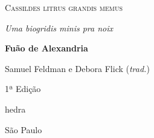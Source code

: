 




\begingroup\thispagestyle{empty}\vspace*{.05\textheight}\parindent=0pt
              \formular
              \Huge 
              \textsc{Cassildes litrus grandis memus}
              \medskip
                      
              \large
              \textit{Uma biogridis minis pra noix}
              \normalsize 
              \vspace{2em}

              \Large
              \textbf{Fuão de Alexandria}
              \bigskip

              \small
              Samuel Feldman e Debora Flick (\textit{trad.})
              \vspace{3em}

   					  1ª Edição
                      

              \vfill

              \newfontfamily{}
              {\fontsize{30}{40}\selectfont \timesnewroman hedra}
              \smallskip

              \small
              São Paulo \the\year
\endgroup
\pagebreak
